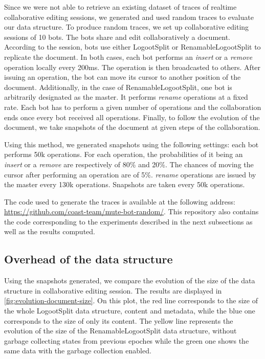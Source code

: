\documentclass{article}
\theoremstyle{definition}
\begin{document}
Since we were not able to retrieve an existing dataset of traces of realtime collaborative editing sessions, we generated and used random traces to evaluate our data structure.
To produce random traces, we set up collaborative editing sessions of 10 bots.
The bots share and edit collaboratively a document.
According to the session, bots use either LogootSplit or RenamableLogootSplit to replicate the document.
In both cases, each bot performs an \emph{insert} or a \emph{remove} operation locally every 200ms.
The operation is then broadcasted to others.
After issuing an operation, the bot can move its cursor to another position of the document.
Additionally, in the case of RenamableLogootSplit, one bot is arbitrarily designated as the master.
It performs \emph{rename} operations at a fixed rate.
Each bot has to perform a given number of operations and the collaboration ends once every bot received all operations.
Finally, to follow the evolution of the document, we take snapshots of the document at given steps of the collaboration.

Using this method, we generated snapshots using the following settings: each bot performs 50k operations.
For each operation, the probabilities of it being an \emph{insert} or a \emph{remove} are respectively of 80\% and 20\%.
The chances of moving the cursor after performing an operation are of 5\%.
\emph{rename} operations are issued by the master every 130k operations.
Snapshots are taken every 50k operations.

The code used to generate the traces is available at the following address: \url{https://github.com/coast-team/mute-bot-random/}.
This repository also contains the code corresponding to the experiments described in the next subsections as well as the results computed.

\subsection{Overhead of the data structure}

Using the snapshots generated, we compare the evolution of the size of the data structure in collaborative editing session.
The results are displayed in \autoref{fig:evolution-document-size}.
On this plot, the red line corresponds to the size of the whole LogootSplit data structure, content and metadata, while the blue one corresponds to the size of only its content.
The yellow line represents the evolution of the size of the RenamableLogootSplit data structure, without garbage collecting states from previous epoches while the green one shows the same data with the garbage collection enabled.
\end{document}
